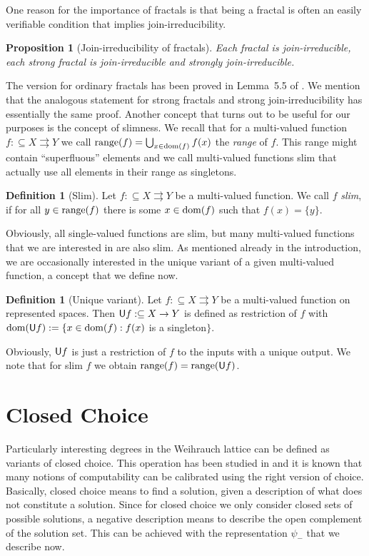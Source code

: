 \documentclass[a4paper]{amsart}
\def\In{\subseteq}
\def\mto{\rightrightarrows}
\def\dom{{\rm dom}}
\def\range{{\rm range}}
\def\U{\text{\rm\sffamily U}}
\newtheorem{proposition}[theorem]{Proposition}
\theoremstyle{definition}
\newtheorem{definition}[theorem]{Definition}
\begin{document}
One reason for the importance of fractals is that being a fractal is often an easily verifiable
condition that implies join-irreducibility. 

\begin{proposition}[Join-irreducibility of fractals]
\label{prop:join-irreducible-fractals}
Each fractal is join-irreducible, each strong fractal is join-irreducible and strongly join-irreducible.
\end{proposition}

The version for ordinary fractals has been proved in Lemma~5.5 of \cite{BBP}.
We mention that the analogous statement for strong fractals and strong join-irreducibility
has essentially the same proof.
Another concept that turns out to be useful for our purposes is the concept
of slimness.
We recall that for a multi-valued function $f:\In X\mto Y$ we call
$\range(f)=\bigcup_{x\in\dom(f)}f(x)$ the {\em range} of $f$. 
This range might contain ``superfluous'' elements and we call
multi-valued functions slim that actually use all elements in
their range as singletons.

\begin{definition}[Slim]
Let $f:\In X\mto Y$ be a multi-valued function. We call $f$ {\em slim},
if for all $y\in\range(f)$ there is some $x\in\dom(f)$ such that $f(x)=\{y\}$.
\end{definition}

Obviously, all single-valued functions are slim, but many multi-valued
functions that we are interested in are also slim. 
As mentioned already in the introduction, we are occasionally interested
in the unique variant of a given multi-valued function, a concept that we define now.

\begin{definition}[Unique variant]
Let $f:\In X\mto Y$ be a multi-valued function on represented spaces.
Then $\U f:\In X\to Y$ is defined as restriction of $f$ with
$\dom(\U f):=\{x\in\dom(f):f(x)$ is a singleton$\}$.
\end{definition}

Obviously, $\U f$ is just a restriction of $f$ to the inputs with a unique output.
We note that for slim $f$ we obtain $\range(f)=\range(\U f)$.


\section{Closed Choice}

Particularly interesting degrees in the Weihrauch lattice can be defined as variants of closed choice.
This operation has been studied in \cite{GM09,BG11,BG11a,BBP} and it is known that many
notions of computability can be calibrated using the right version of choice. 
Basically, closed choice means to find a solution, given a description of what does
not constitute a solution. Since for closed choice we only consider closed sets of possible solutions, a negative
description means to describe the open complement of the solution set.
This can be achieved with the representation $\psi_-$ that we describe now.
\end{document}

